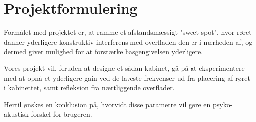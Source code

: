 \chapter{Projektformulering}


Formålet med projektet er, at ramme et afstandsmæssigt "sweet-spot", hvor røret danner yderligere konstruktiv interferens med overfladen den er i nærheden af, og dermed giver mulighed for at forstærke basgengivelsen yderligere. 

Vores projekt vil, foruden at designe et sådan kabinet, gå på at eksperimentere med at opnå et yderligere gain ved de laveste frekvenser ud fra placering af røret i kabinettet, samt refleksion fra nærtliggende overflader.

Hertil ønskes en konklusion på, hvorvidt disse parametre vil gøre en psyko-akustisk forskel for brugeren. 




